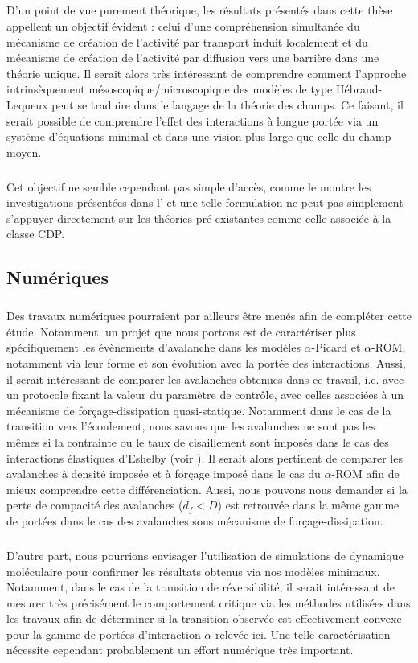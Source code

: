 \subparagraph{}D'un point de vue purement théorique, les résultats présentés dans cette thèse appellent un objectif évident : celui d'une compréhension simultanée du mécanisme de création de l'activité par transport induit localement et du mécanisme de création de l'activité par diffusion vers une barrière dans une théorie unique. Il serait alors très intéressant de comprendre comment l'approche intrinsèquement mésoscopique/microscopique des modèles de type Hébraud-Lequeux peut se traduire dans le langage de la théorie des champs. Ce faisant, il serait possible de comprendre l'effet des interactions à longue portée via un système d'équations minimal et dans une vision plus large que celle du champ moyen.

\subparagraph{}Cet objectif ne semble cependant pas simple d'accès, comme le montre les investigations présentées dans l' et une telle formulation ne peut pas simplement s'appuyer directement sur les théories pré-existantes comme celle associée à la classe CDP.

\subsection*{Numériques}

\subparagraph{}Des travaux numériques pourraient par ailleurs être menés afin de compléter cette étude. Notamment, un projet que nous portons est de caractériser plus spécifiquement les évènements d'avalanche dans les modèles $\alpha$-Picard et $\alpha$-ROM, notamment via leur forme \cite{wiese_theory_2022} et son évolution avec la portée des interactions. Aussi, il serait intéressant de comparer les avalanches obtenues dans ce travail, i.e. avec un protocole fixant la valeur du paramètre de contrôle, avec celles associées à un mécanisme de forçage-dissipation quasi-statique. Notamment dans le cas de la transition vers l'écoulement, nous savons que les avalanches ne sont pas les mêmes si la contrainte ou le taux de cisaillement sont imposés dans le cas des interactions élastiques d'Eshelby (voir ). Il serait alors pertinent de comparer les avalanches à densité imposée et à forçage imposé dans le cas du $\alpha$-ROM afin de mieux comprendre cette différenciation. Aussi, nous pouvons nous demander si la perte de compacité des avalanches ($d_f < D$) est retrouvée dans la même gamme de portées dans le cas des avalanches sous mécanisme de forçage-dissipation.

\subparagraph{}D'autre part, nous pourrions envisager l'utilisation de simulations de dynamique moléculaire pour confirmer les résultats obtenus via nos modèles minimaux. Notamment, dans le cas de la transition de réversibilité, il serait intéressant de mesurer très précisément le comportement critique via les méthodes utilisées dans les travaux \cite{metzger_irreversibility_2010, ge_rheology_2022} afin de déterminer si la transition observée est effectivement convexe pour la gamme de portées d'interaction $\alpha$ relevée ici. Une telle caractérisation nécessite cependant probablement un effort numérique très important.

